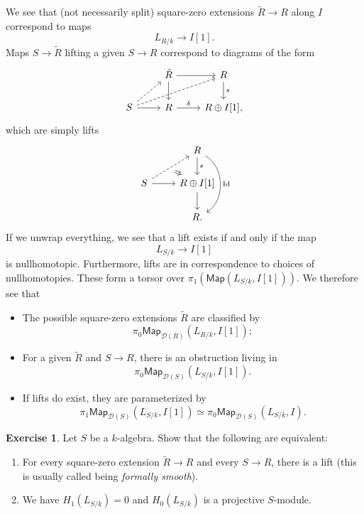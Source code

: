 \documentclass[10pt]{amsart}
\theoremstyle{definition}
\newtheorem{exer}[thm]{Exercise}
\theoremstyle{remark}
\theoremstyle{plain}
\theoremstyle{definition}
\theoremstyle{remark}
\newcommand{\mc}[1]{\mathcal{#1}}
\newcommand{\mr}[1]{\mathrm{#1}}
\newcommand{\ms}[1]{\mathsf{#1}}
\newcommand{\1}{\mathbf{1}}
\newcommand{\2}{\mathbf{2}}
\newcommand{\3}{\mathbf{3}}
\begin{document}
We see that (not necessarily split) square-zero extensions $\tilde{R} \to R$ along $I$ correspond to maps
\[ L_{R/k} \to I[1]. \]
Maps $S \to \tilde{R}$ lifting a given $S \to R$ correspond to diagrams of the form
\begin{equation*}
\begin{tikzcd}
    & \tilde{R} \ar{r} \ar{d} & R \ar{d}{s} \\
    S \ar[dashrightarrow]{ur} \ar[dashrightarrow]{urr} \ar{r} & R \ar{r}{\delta} & R \oplus I[1],
\end{tikzcd}
\end{equation*}
which are simply lifts
\begin{equation*}
\begin{tikzcd}
    & R \ar{d}{s} \ar[bend left=60]{dd}{\mr{Id}} \\
    S \ar[dashrightarrow,""{swap,name=L}]{ur} \ar{r} & R \oplus I[1] \ar{d} \ar[Leftarrow, to=L] \\
    & R.
\end{tikzcd}
\end{equation*}
If we unwrap everything, we see that a lift exists if and only if the map
\[ L_{S/k} \to I[1] \]
is nullhomotopic. Furthermore, lifts are in correspondence to choices of nullhomotopies. These form a torsor over $\pi_1(\ms{Map}(L_{S/k}, I[1]))$. We therefore see that
\begin{itemize}
    \item The possible square-zero extensions $\tilde{R}$ are classified by
    \[ \pi_0 \ms{Map}_{\mc{D}(R)} (L_{R/k}, I[1]); \]
    \item For a given $\tilde{R}$ and $S \to R$, there is an obstruction living in
    \[ \pi_0 \ms{Map}_{\mc{D}(S)} (L_{S/k}, I[1]). \]
    \item If lifts do exist, they are parameterized by
    \[ \pi_1 \ms{Map}_{\mc{D}(S)} (L_{S/k}, I[1]) \simeq \pi_0 \ms{Map}_{\mc{D}(S)}(L_{S/k}, I). \]
\end{itemize}

\begin{exer}
    Let $S$ be a $k$-algebra. Show that the following are equivalent:
    \begin{enumerate}
        \item For every square-zero extension $\tilde{R} \to R$ and every $S \to R$, there is a lift (this is usually called being \textit{formally smooth}).
        \item We have $H_1(L_{S/k})= 0$ and $H_0(L_{S/k})$ is a projective $S$-module.
    \end{enumerate}
\end{exer}
\end{document}
